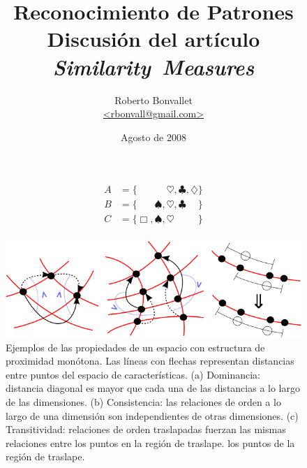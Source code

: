 \documentclass[spanish]{article}
\title{Reconocimiento de Patrones \\
    Discusión del artículo \textit{Similarity~Measures}}
\author{Roberto Bonvallet \\ \url {<rbonvall@gmail.com>}}
\date{Agosto de 2008}
\begin{document}
\maketitle

\newcommand{\SMA}{\Box}
\newcommand{\SMB}{\spadesuit}
\newcommand{\SMC}{\heartsuit}
\newcommand{\SMD}{\clubsuit}
\newcommand{\SME}{\diamondsuit}

\begin{align*}
    A &= \{\phantom{\SMA,  \SMB,} \SMC,          \SMD,          \SME\}  \\
    B &= \{\phantom{\SMA,} \SMB,  \SMC,          \SMD\phantom{, \SME}\} \\
    C &=          \{\SMA,  \SMB,  \SMC\phantom{, \SMD,          \SME}\} \\
\end{align*}

\begin{figure}
  \centering
  \includegraphics[bb=0 0 513 166]{imagenes/dom-cons-trans.png}
  \caption{%
    Ejemplos de las propiedades de un espacio con estructura de proximidad
    monótona. Las líneas con flechas representan distancias entre puntos del
    espacio de características.
    (a) Dominancia: distancia diagonal es mayor que cada una de las distancias
        a lo largo de las dimensiones.
    (b) Consistencia: las relaciones de orden a lo largo de una dimensión son
        independientes de otras dimensiones.
    (c) Transitividad: relaciones de orden traslapadas fuerzan las mismas
        relaciones entre los puntos en la región de traslape.
        los puntos de la región de traslape.
  }
  \label{fig:cons-dom-trans}
\end{figure}
\end{document}
